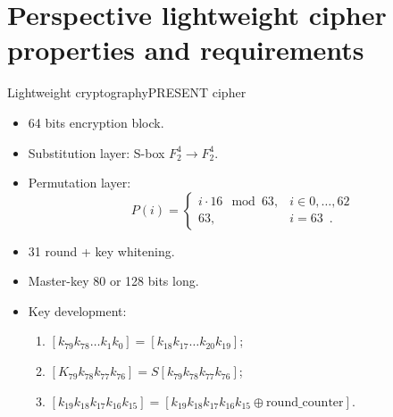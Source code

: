 \documentclass[10pt, ucs]{beamer}
\begin{document}
\section{Perspective lightweight cipher properties and requirements}
\begin{frame}{Lightweight cryptography}{PRESENT cipher}
    \begin{minipage}[t]{0.65\textwidth}
        \begin{itemize}
            \item 64 bits encryption block.
            \item Substitution layer: S-box $F_2^4 \rightarrow F_2^4$. \\
            \item Permutation layer:
                \begin{equation}
                    \label{eqn:player}
                    \nonumber
                    P(i) = \left\{
                    \begin{array}{ll}
                        i \cdot 16 \mod 63, & i \in {0, \hdots, 62} \\
                        63,  & i = 63 \enspace .
                    \end{array} \right.
                \end{equation}
            \item 31 round + key whitening.
            \item Master-key 80 or 128 bits long.
            \item Key development:
                \begin{enumerate}
                    \setlength{\itemsep}{1pt}
                        \setlength{\parskip}{0pt}
                        \setlength{\parsep}{0pt}
                    \item $ [k_{79} k_{78} \hdots k_1 k_0] = [k_{18} k_{17} \hdots k_{20} k_{19}] $;
                    \item $ [K_{79} k_{78} k_{77} k_{76}] = S[k_{79} k_{78} k_{77} k_{76}] $;
                    \item $ [k_{19} k_{18} k_{17} k_{16} k_{15}] = [k_{19} k_{18} k_{17} k_{16} k_{15}
                        \oplus \mbox{round\_counter}] $.
                \end{enumerate}
        \end{itemize}
    \end{minipage}%
    \begin{minipage}[t]{0.35\linewidth}
        \begin{figure}[h]

\end{figure}
\end{minipage}
\end{frame}
\end{document}
